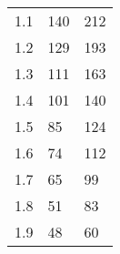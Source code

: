 \begin{table}[H]
{\begin{tabular}{|l|l|l|}
1.1                      & 140                                                                                                                  & 212                                                                                                                    \\
1.2                      & 129                                                                                                                  & 193                                                                                                                    \\
1.3                      & 111                                                                                                                  & 163                                                                                                                    \\
1.4                      & 101                                                                                                                  & 140                                                                                                                    \\
1.5                      & 85                                                                                                                   & 124                                                                                                                    \\
1.6                      & 74                                                                                                                   & 112                                                                                                                    \\
1.7                      & 65                                                                                                                   & 99                                                                                                                     \\
1.8                      & 51                                                                                                                   & 83                                                                                                                     \\
1.9                      & 48                                                                                                                   & 60                                                                                                                     \\

\end{tabular}}
\end{table}
